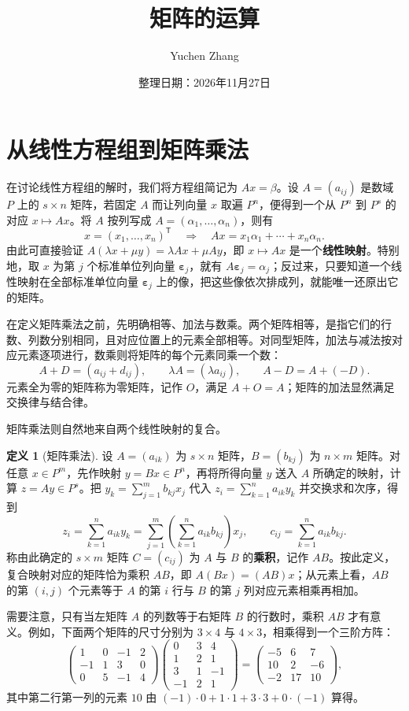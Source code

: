 \documentclass[UTF8,fontset=fandol,a4paper,12pt]{ctexart}
\title{矩阵的运算}
\author{Yuchen Zhang}
\date{整理日期：2026年11月27日}
\makeatletter
\newcommand{\trans}{\mathsf T}
\newcommand{\ve}{\boldsymbol{\varepsilon}}
\theoremstyle{definition}
\newtheorem{definition}{定义}[section]
\renewcommand{\maketitle}{%
  \begin{center}
    {\LARGE\bfseries \@title\par}\vspace{0.6em}
    \@author\par\vspace{0.2em}
    {\small \@date\par}
  \end{center}}
\makeatother
\begin{document}
\maketitle

\section{从线性方程组到矩阵乘法}

在讨论线性方程组的解时，我们将方程组简记为 $Ax=\beta$。设 $A=(a_{ij})$ 是数域 $P$ 上的 $s\times n$ 矩阵，若固定 $A$ 而让列向量 $x$ 取遍 $P^n$，便得到一个从 $P^n$ 到 $P^s$ 的对应 $x\mapsto Ax$。将 $A$ 按列写成 $A=(\alpha_1,\ldots,\alpha_n)$，则有
\[
  x=(x_1,\ldots,x_n)^{\trans}
  \quad\Longrightarrow\quad
  Ax=x_1\alpha_1+\cdots+x_n\alpha_n.
\]
由此可直接验证 $A(\lambda x+\mu y)=\lambda Ax+\mu Ay$，即 $x\mapsto Ax$ 是一个\textbf{线性映射}。特别地，取 $x$ 为第 $j$ 个标准单位列向量 $\ve_j$，就有 $A\ve_j=\alpha_j$；反过来，只要知道一个线性映射在全部标准单位向量 $\ve_j$ 上的像，把这些像依次排成列，就能唯一还原出它的矩阵。

在定义矩阵乘法之前，先明确相等、加法与数乘。两个矩阵相等，是指它们的行数、列数分别相同，且对应位置上的元素全部相等。对同型矩阵，加法与减法按对应元素逐项进行，数乘则将矩阵的每个元素同乘一个数：
\[
  A+D=(a_{ij}+d_{ij}),\qquad \lambda A=(\lambda a_{ij}),\qquad A-D=A+(-D).
\]
元素全为零的矩阵称为零矩阵，记作 $O$，满足 $A+O=A$；矩阵的加法显然满足交换律与结合律。

矩阵乘法则自然地来自两个线性映射的复合。

\begin{definition}[矩阵乘法]
设 $A=(a_{ik})$ 为 $s\times n$ 矩阵，$B=(b_{kj})$ 为 $n\times m$ 矩阵。对任意 $x\in P^m$，先作映射 $y=Bx\in P^n$，再将所得向量 $y$ 送入 $A$ 所确定的映射，计算 $z=Ay\in P^s$。把 $y_k=\sum_{j=1}^{m} b_{kj}x_j$ 代入 $z_i=\sum_{k=1}^{n}a_{ik}y_k$ 并交换求和次序，得到
\[
 z_i=\sum_{k=1}^{n}a_{ik}y_k
    =\sum_{j=1}^{m}\left(\sum_{k=1}^{n}a_{ik}b_{kj}\right)x_j,
 \qquad
 c_{ij}=\sum_{k=1}^{n}a_{ik}b_{kj}.
\]
称由此确定的 $s\times m$ 矩阵 $C=(c_{ij})$ 为 $A$ 与 $B$ 的\textbf{乘积}，记作 $AB$。按此定义，复合映射对应的矩阵恰为乘积 $AB$，即 $A(Bx)=(AB)x$；从元素上看，$AB$ 的第 $(i,j)$ 个元素等于 $A$ 的第 $i$ 行与 $B$ 的第 $j$ 列对应元素相乘再相加。
\end{definition}

需要注意，只有当左矩阵 $A$ 的列数等于右矩阵 $B$ 的行数时，乘积 $AB$ 才有意义。例如，下面两个矩阵的尺寸分别为 $3\times4$ 与 $4\times3$，相乘得到一个三阶方阵：
\[
 \begin{pmatrix}1&0&-1&2\\-1&1&3&0\\0&5&-1&4\end{pmatrix}
 \begin{pmatrix}0&3&4\\1&2&1\\3&1&-1\\-1&2&1\end{pmatrix}
 =\begin{pmatrix}-5&6&7\\10&2&-6\\-2&17&10\end{pmatrix},
\]
其中第二行第一列的元素 $10$ 由 $(-1)\cdot0+1\cdot1+3\cdot3+0\cdot(-1)$ 算得。
\end{document}
